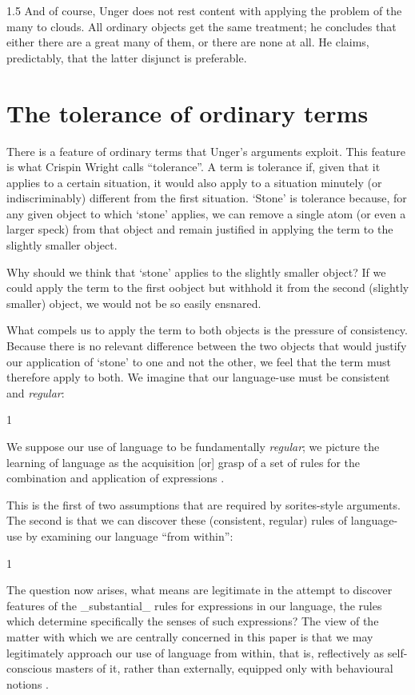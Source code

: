 \documentclass[11pt]{article}
\newenvironment{squote}{%
\begin{spacing}{1}
       	\begin{list}{}{%
\setlength{\labelwidth}{0pt}%
\rightmargin\leftmargin%
}
\item\relax
}{%
\end{list}%
\end{spacing}
}
\begin{document}
\begin{spacing}{1.5}
And of course, Unger does not rest content with applying the problem
of the many to clouds.  All ordinary objects get the same treatment;
he concludes that either there are a great many of them, or there are
none at all.  He claims, predictably, that the latter disjunct is
preferable.

\section{The tolerance of ordinary terms}
There is a feature of ordinary terms that Unger's arguments exploit.
This feature is what Crispin Wright calls ``tolerance''.  A term is
tolerance if, given that it applies to a certain situation, it would
also apply to a situation minutely (or indiscriminably) different from
the first situation.  `Stone' is tolerance because, for any given
object to which `stone' applies, we can remove a single atom (or even
a larger speck) from that object and remain justified in applying the
term to the slightly smaller object.

Why should we think that `stone' applies to the slightly smaller
object?  If we could apply the term to the first oobject but withhold
it from the second (slightly smaller) object, we would not be so
easily ensnared.

What compels us to apply the term to both objects is the pressure of
consistency.  Because there is no relevant difference between the two
objects that would justify our application of `stone' to one and not
the other, we feel that the term must therefore apply to both.  We
imagine that our language-use must be consistent and {\em regular}:

\begin{squote}
We suppose our use of language to be fundamentally {\em regular}; we
picture the learning of language as the acquisition [or] grasp of a
set of rules for the combination and application of expressions
\citep[326]{wright1975}.

This is the first of two assumptions that are required by
sorites-style arguments.  The second is that we can discover these
(consistent, regular) rules of language-use by examining our language
``from within'':

\begin{squote}
The question now arises, what means are legitimate in the attempt to
discover features of the _substantial_ rules for expressions in our
language, the rules which determine specifically the senses of such
expressions?  The view of the matter with which we are centrally
concerned in this paper is that we may legitimately approach our use
of language from within, that is, reflectively as self-conscious
masters of it, rather than externally, equipped only with behavioural
notions \citep[327]{wright1975}.
\end{squote}


\end{squote}
\end{spacing}
\end{document}
